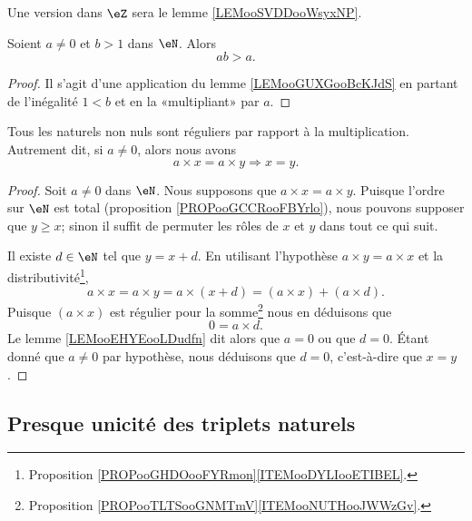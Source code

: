 Une version dans \( \eZ\) sera le lemme \ref{LEMooSVDDooWsyxNP}.
\begin{lemma}        \label{LEMooSFUKooBNAple}
	Soient \( a\neq 0\) et \( b>1\) dans \( \eN\). Alors
	\begin{equation}
		ab>a.
	\end{equation}
\end{lemma}

\begin{proof}
	Il s'agit d'une application du lemme \ref{LEMooGUXGooBcKJdS} en partant de l'inégalité \( 1<b\) et en la «multipliant» par \( a\).
\end{proof}

\begin{proposition}
	Tous les naturels non nuls sont réguliers par rapport à la multiplication. Autrement dit, si \( a\neq 0\), alors nous avons
	\begin{equation}
		a\times x=a\times y\Rightarrow x=y.
	\end{equation}
\end{proposition}

\begin{proof}
	Soit \( a\neq 0\) dans \( \eN\). Nous supposons que \( a\times x=a\times y\). Puisque l'ordre sur \( \eN\) est total (proposition \ref{PROPooGCCRooFBYrlo}), nous pouvons supposer que \( y\geq x\); sinon il suffit de permuter les rôles de \( x\) et \( y\) dans tout ce qui suit.

	Il existe \( d\in \eN\) tel que \( y=x+d\). En utilisant l'hypothèse \( a\times y=a\times x\) et la distributivité\footnote{Proposition \ref{PROPooGHDOooFYRmon}\ref{ITEMooDYLIooETIBEL}.},
	\begin{equation}
		a\times x=a\times y=a\times (x+d)=(a\times x)+(a\times d).
	\end{equation}
	Puisque \( (a\times x)\) est régulier pour la somme\footnote{Proposition \ref{PROPooTLTSooGNMTmV}\ref{ITEMooNUTHooJWWzGv}.} nous en déduisons que
	\begin{equation}
		0=a\times d.
	\end{equation}
	Le lemme \ref{LEMooEHYEooLDudfn} dit alors que \( a=0\) ou que \( d=0\). Étant donné que \( a\neq 0\) par hypothèse, nous déduisons que \( d=0\), c'est-à-dire que \( x=y\).
\end{proof}

\subsection{Presque unicité des triplets naturels}

